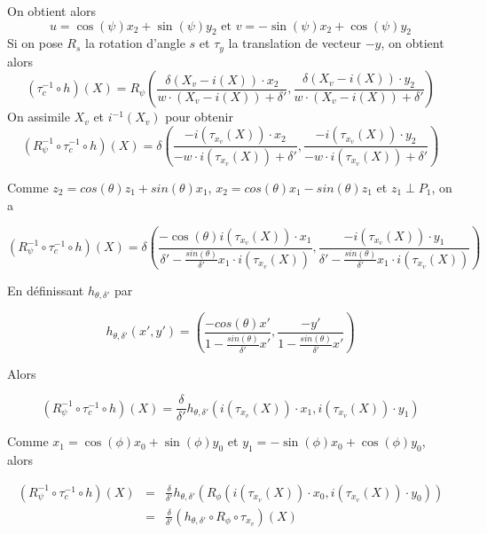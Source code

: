 On obtient alors 
\begin{equation*}
u=\cos(\psi)x_{2}+\sin(\psi)y_{2} \text{ et } v=-\sin(\psi)x_{2}+\cos(\psi)y_{2}
\end{equation*}
Si on pose $R_{s}$ la rotation d'angle $s$ et $\tau_{y}$ la translation de vecteur $-y$, on obtient alors 
\begin{equation*}
(\tau_{c}^{-1} \circ h)(X) = R_{\psi}\left(\frac{\delta (X_{v}-i(X))\cdot x_{2} }{w \cdot (X_{v}-i(X))+\delta'},\frac{\delta (X_{v}-i(X))\cdot y_{2}}{w \cdot (X_{v}-i(X))+\delta'}  \right) 
\end{equation*}
On assimile $X_{v}$ et $i^{-1}(X_{v})$ pour obtenir
\begin{equation*}
(R_{\psi}^{-1} \circ \tau_{c}^{-1}  \circ h)(X)=\delta \left(\frac{-i(\tau_{x_{v}} (X))\cdot x_{2} }{-w \cdot i(\tau_{x_{v}} (X))+\delta'},\frac{-i(\tau_{x_{v}} (X))\cdot y_{2}}{-w \cdot i(\tau_{x_{v}} (X))+\delta'}  \right) 
\end{equation*}

Comme $z_{2}=cos(\theta)z_{1}+sin(\theta)x_{1}$, $x_{2}=cos(\theta)x_{1}-sin(\theta)z_{1}$ et $z_{1}\perp P_{1}$, on a

\begin{equation*}
(R_{\psi}^{-1} \circ \tau_{c}^{-1}  \circ h)(X)=\delta\left(\frac{-\cos(\theta)i(\tau_{x_{v}} (X))\cdot x_{1} }{\delta'-\frac{sin(\theta)}{\delta'}x_{1}\cdot i(\tau_{x_{v}}(X))}, \frac{-i(\tau_{x_{v}} (X))\cdot y_{1}}{\delta'-\frac{sin(\theta)}{\delta'}x_{1}\cdot i(\tau_{x_{v}}(X))}  \right) 
\end{equation*}

En définissant $h_{\theta,\delta'}$ par

\begin{equation*}
h_{\theta,\delta'}(x',y')=\left(\frac{-cos(\theta)x'}{1-\frac{sin(\theta)}{\delta'}x'} ,\frac{-y'}{1-\frac{sin(\theta)}{\delta'}x'}\right)
\end{equation*}

Alors 

\begin{equation*}
(R_{\psi}^{-1} \circ \tau_{c}^{-1} \circ h)(X)= \frac{\delta}{\delta'}h_{\theta,\delta'}\left ( i(\tau_{x_{v}}(X)) \cdot x_{1}, i(\tau_{x_{v}}(X)) \cdot y_{1}\right)
\end{equation*}

Comme $x_{1}=\cos(\phi)x_{0}+\sin(\phi)y_{0}$ et $y_{1}=-\sin(\phi)x_{0}+\cos(\phi)y_{0}$, alors

\begin{eqnarray*}
(R_{\psi}^{-1} \circ \tau_{c}^{-1} \circ h)(X) &=& \frac{\delta}{\delta'}h_{\theta,\delta'}\left ( R_{\phi}(i(\tau_{x_{v}}(X)) \cdot x_{0}, i(\tau_{x_{v}}(X)) \cdot y_{0})\right)\\
                                               &=&\frac{\delta}{\delta'} (h_{\theta,\delta'}\circ R_{\phi} \circ \tau_{x_{v}})(X)
\end{eqnarray*}

